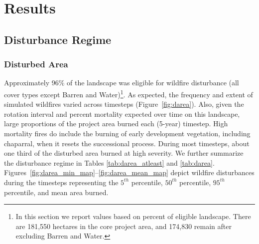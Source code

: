\section{Results}
\label{sec:hrvresults}
\subsection{Disturbance Regime}


\subsubsection{Disturbed Area} 


Approximately 96\% of the landscape was eligible for wildfire disturbance (all cover types except Barren and Water)\footnote{In this section we report values based on percent of eligible landscape. There are 181,550 hectares in the core project area, and 174,830 remain after excluding Barren and Water.}. As expected, the frequency and extent of simulated wildfires varied across timesteps (Figure~\ref{fig:darea}). Also, given the rotation interval and percent mortality expected over time on this landscape, large proportions of the project area burned each (5-year) timestep. High mortality fires do include the burning of early development vegetation, including chaparral, when it resets the successional process. During most timesteps, about one third of the disturbed area burned at high severity. We further summarize the disturbance regime in Tables \ref{tab:darea_atleast} and \ref{tab:darea}. Figures~\ref{fig:darea_min_map}--\ref{fig:darea_mean_map} depict wildfire disturbances during the timesteps representing the $5^{th}$ percentile, $50^{th}$ percentile, $95^{th}$ percentile, and mean area burned. 

